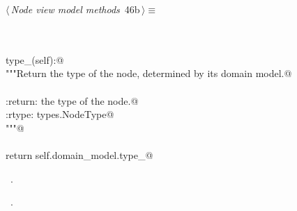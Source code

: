 \documentclass[
    a4paper,      %
    10pt,         %
    openright,    %
    notitlepage,  %
    parskip=half, %
]{scrreprt}       %
\theoremstyle{definition}                    %
\begin{document}
\begin{flushleft} \small
\begin{minipage}{\linewidth}\label{scrap61}\raggedright\small
{} $\langle\,${\itshape Node view model methods}\nobreak\ {\footnotesize {46b}}$\,\rangle\equiv$
\vspace{-1exm}
\begin{list}{}{} \item
\mbox{}\lstinline@@\\
\mbox{}\lstinline@property@\\
\mbox{}\lstinline@def type_(self):@\\
\mbox{}\lstinline@    """Return the type of the node, determined by its domain model.@\\
\mbox{}\lstinline@@\\
\mbox{}\lstinline@    :return: the type of the node.@\\
\mbox{}\lstinline@    :rtype: types.NodeType@\\
\mbox{}\lstinline@    """@\\
\mbox{}\lstinline@@\\
\mbox{}\lstinline@    return self.domain_model.type_@\\
\mbox{}\lstinline@@{\NWsep}
\end{list}
\vspace{-1.5ex}
\footnotesize
\begin{list}{}{\setlength{\itemsep}{-\parsep}\setlength{\itemindent}{-\leftmargin}}
\item \NWtxtMacroDefBy\ .
\item \NWtxtMacroRefIn\ .

\item{}
\end{list}
\end{minipage}\vspace{4ex}
\end{flushleft}
\end{document}
